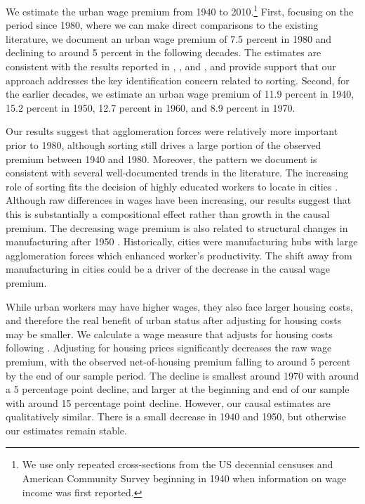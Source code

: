 \documentclass[12pt]{article}
\begin{document}
We estimate the urban wage premium from 1940 to 2010.\footnote{We use only repeated cross-sections from the US decennial censuses and American Community Survey beginning in 1940 when information on wage income was first reported.}
First, focusing on the period since 1980, where we can make direct comparisons to the existing literature, we document an urban wage premium of 7.5 percent in 1980 and declining to around 5 percent in the following decades.
The estimates are consistent with the results reported in \citet*{Glaeser_Mare_2001}, \cite*{Yankow_2006}, and \citet*{BaumSnow_Pavan_2012}, and provide support that our approach addresses the key identification concern related to sorting.
Second, for the earlier decades, we estimate an urban wage premium of 11.9 percent in 1940, 15.2 percent in 1950, 12.7 percent in 1960, and 8.9 percent in 1970. 

Our results suggest that agglomeration forces were relatively more important prior to 1980, although sorting still drives a large portion of the observed premium between 1940 and 1980.
Moreover, the pattern we document is consistent with several well-documented trends in the literature. 
The increasing role of sorting fits the decision of highly educated workers to locate in cities \citep*{costa2000power,shapiro2006smart, moretti2013real, Diamond_2016}. 
Although raw differences in wages have been increasing, our results suggest that this is substantially a compositional effect rather than growth in the causal premium. 
The decreasing wage premium is also related to structural changes in manufacturing after 1950 \citep*{dumais2002geographic, glaeser2010did}. 
Historically, cities were manufacturing hubs with large agglomeration forces which enhanced worker's productivity. 
The shift away from manufacturing in cities could be a driver of the decrease in the causal wage premium. 

While urban workers may have higher wages, they also face larger housing costs, and therefore the real benefit of urban status after adjusting for housing costs may be smaller.
We calculate a wage measure that adjusts for housing costs following \citet{ganong2017has}.
Adjusting for housing prices significantly decreases the raw wage premium, with the observed net-of-housing premium falling to around 5 percent by the end of our sample period.
The decline is smallest around 1970 with around a 5 percentage point decline, and larger at the beginning and end of our sample with around 15 percentage point decline. 
However, our causal estimates are qualitatively similar.
There is a small decrease in 1940 and 1950, but otherwise our estimates remain stable. 
\end{document}
